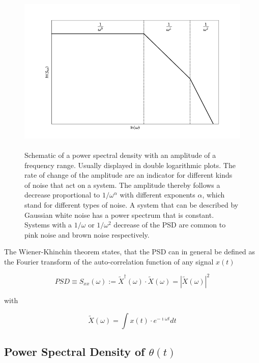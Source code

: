 \begin{figure}[H]
    \centering
    \includegraphics[width=14cm, height=8cm]{figures/2021_12_02_RTS_schematic_PSD.png}
    \captionsetup{width=12cm}
    \caption{Schematic of a power spectral density with an amplitude of a frequency range. Usually displayed in double logarithmic plots. The rate of change of the amplitude are an indicator for different kinds of noise that act on a system. The amplitude thereby follows a decrease proportional to $1/\omega^{\alpha}$ with different exponents $\alpha$, which stand for different types of noise. A system that can be described by Gaussian white noise has a power spectrum that is constant. Systems with a $1/\omega$ or $1/\omega^{2}$ decrease of the PSD are common to pink noise and brown noise respectively.}
    \label{fig:PSD_schematic}
\end{figure}

The Wiener-Khinchin theorem states, that the PSD can in general be defined as the Fourier transform of the auto-correlation function of any signal $x(t)$ \cite{Wiener1930} \cite{Khintchine1934}

\begin{equation}
\label{eq:PSD_base}
    PSD \equiv S_{xx}(\omega) := \tilde{X}^{\dagger}(\omega) \cdot \tilde{X}(\omega) = |\tilde{X}(\omega)|^{2}
\end{equation}

with

\begin{equation}
\label{eq:FT}
    \tilde{X}(\omega) = \int{x(t) \cdot e^{-\imath \omega t}}dt
\end{equation}

\subsection{Power Spectral Density of $\theta(t)$}

